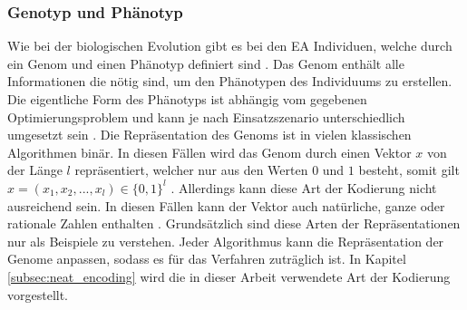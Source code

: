 \subsubsection{Genotyp und Phänotyp}
Wie bei der biologischen Evolution gibt es bei den \ac{EA} Individuen, welche durch ein Genom und einen Phänotyp definiert sind \cite{weicker2015evolutionare}. Das Genom enthält alle Informationen die nötig sind, um den Phänotypen des Individuums zu erstellen. Die eigentliche Form des Phänotyps ist abhängig vom gegebenen Optimierungsproblem und kann je nach Einsatzszenario unterschiedlich umgesetzt sein \cite{rothlauf2006representation}. Die Repräsentation des Genoms ist in vielen klassischen Algorithmen binär. In diesen Fällen wird das Genom durch einen Vektor $x$ von der Länge $l$ repräsentiert, welcher nur aus den Werten $0$ und $1$ besteht, somit gilt $x= (x_1, x_2, ..., x_l) \in \{0, 1\}^l$ \cite{rothlauf2006representation}. Allerdings kann diese Art der Kodierung nicht ausreichend sein. In diesen Fällen kann der Vektor auch natürliche, ganze oder rationale Zahlen enthalten \cite{rothlauf2006representation}. Grundsätzlich sind diese Arten der Repräsentationen nur als Beispiele zu verstehen. Jeder Algorithmus kann die Repräsentation der Genome anpassen, sodass es für das Verfahren zuträglich ist. In Kapitel \ref{subsec:neat_encoding} wird die in dieser Arbeit verwendete Art der Kodierung vorgestellt. 

